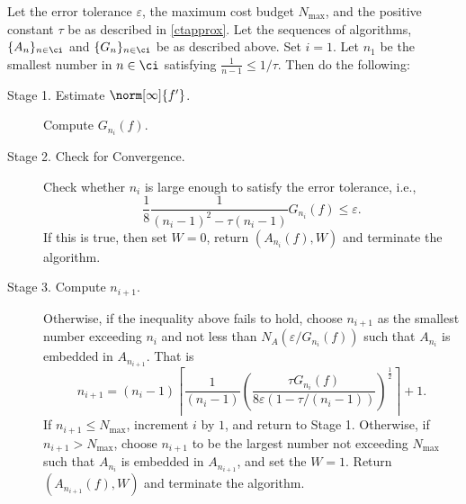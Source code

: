 \begin{algo}
Let the error tolerance $\varepsilon$, the maximum cost budget $N_{\max}$, and the positive constant $\tau$ be as described in  \eqref{ctapprox}. Let the sequences of algorithms, $\{A_n\}_{n \in \ci}$ and  $\{G_n\}_{n \in \ci}$ be as described above.  Set $i=1$.  Let $n_1$ be the smallest number in $n \in \ci$ satisfying $\frac{1}{n-1} \le 1/\tau$. Then do the following:
\begin{description}

\item [Stage 1. Estimate {$\norm[\infty]{f'} $}.]
Compute $G_{n_i}(f)$.
\item [Stage 2. Check for Convergence.]
 Check whether $n_i$ is large enough to satisfy the error tolerance, i.e.,
$$
\frac{1}{8}\frac{1}{(n_i-1)^{2} - \tau (n_i-1)} G_{n_i}(f) \le \varepsilon.
$$
If this is true, then set $W=0$, return $(A_{n_i}(f),W)$ and terminate the algorithm.


\item[Stage 3. Compute $n_{i+1}$.]  Otherwise, if the inequality above fails to hold,
choose $n_{i+1}$ as the smallest number exceeding $n_i$ and not less than $N_{A}(\varepsilon /G_{n_i}(f))$ such that $A_{n_{i}}$ is embedded in $A_{n_{i+1}}$. That is
$$n_{i+1}=(n_i-1)\left\lceil\frac{1}{(n_i-1)}\left(\frac{\tau G_{n_i}(f)}{8\varepsilon(1-\tau/(n_i-1))}\right)^{\frac{1}{2}}\right\rceil+1.$$
 If $n_{i+1} \le N_{\max}$, increment $i$ by $1$, and return to Stage 1.
Otherwise, if $n_{i+1} > N_{\max}$, choose $n_{i+1}$ to be the largest number not exceeding $N_{\max}$ such that $A_{n_{i}}$ is embedded in $A_{n_{i+1}}$, and set the $W=1$. Return $(A_{n_{i+1}}(f),W)$ and terminate the algorithm.
\end{description}
\end{algo}

